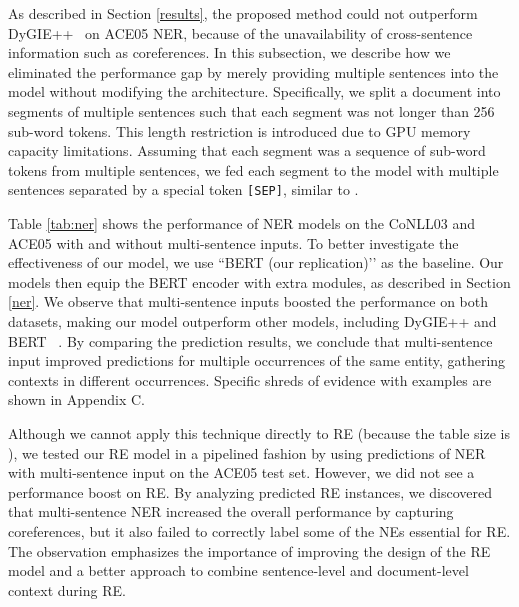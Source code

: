 \documentclass[11pt,a4paper]{article}
\begin{document}
As described in Section \ref{results}, the proposed method could not outperform DyGIE++~\cite{Wadden2019EntityRA} on ACE05 NER, because of the unavailability of cross-sentence information such as coreferences. In this subsection, we describe how we eliminated the performance gap by merely providing multiple sentences into the model without modifying the architecture. Specifically, we split a document into segments of multiple sentences such that each segment was not longer than 256 sub-word tokens. This length restriction is introduced due to GPU memory capacity limitations. Assuming that each segment was a sequence of sub-word tokens from multiple sentences, we fed each segment to the model with multiple sentences separated by a special token {\tt [SEP]}, similar to \citet{devlin-etal-2019-bert}.




Table \ref{tab:ner} shows the performance of NER models on the CoNLL03 and ACE05 with and without multi-sentence inputs. To better investigate the effectiveness of our model, we use ``BERT (our replication)’’ as the baseline. Our models then equip the BERT encoder with extra modules, as described in Section \ref{ner}.
We observe that multi-sentence inputs boosted the performance on both datasets, making our model outperform other models, including DyGIE++ and BERT~ \cite{devlin-etal-2019-bert}.
By comparing the prediction results, we conclude that multi-sentence input improved predictions for multiple occurrences of the same entity, gathering contexts in different occurrences. Specific shreds of evidence with examples are shown in Appendix C.


Although we cannot apply this technique directly to RE (because the table size is ), we tested our RE model in a pipelined fashion by using predictions of NER with multi-sentence input on the ACE05 test set. However, we did not see a performance boost on RE. By analyzing predicted RE instances, we discovered that multi-sentence NER increased the overall performance by capturing coreferences, but it also failed to correctly label some of the NEs essential for RE. The observation emphasizes the importance of improving the design of the RE model and a better approach to combine sentence-level and document-level context during RE. 
\end{document}
